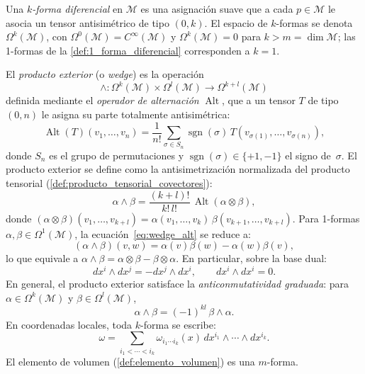\begin{definition}\label{def:producto_exterior_k_formas}
Una \textit{$k$-forma diferencial} en $\mathcal{M}$ es una asignación suave que a cada $p \in \mathcal{M}$ le asocia un tensor antisimétrico de tipo $(0, k)$. El espacio de $k$-formas se denota $\Omega^k(\mathcal{M})$, con $\Omega^0(\mathcal{M}) = C^\infty(\mathcal{M})$ y $\Omega^k(\mathcal{M}) = 0$ para $k > m = \dim \mathcal{M}$; las 1-formas de la \autoref{def:1_forma_diferencial} corresponden a $k = 1$.

El \textit{producto exterior} (o \textit{wedge}) es la operación
\[
\wedge: \Omega^k(\mathcal{M}) \times \Omega^l(\mathcal{M}) \longrightarrow \Omega^{k+l}(\mathcal{M})
\]
definida mediante el \textit{operador de alternación} $\operatorname{Alt}$, que a un tensor $T$ de tipo $(0,n)$ le asigna su parte totalmente antisimétrica:
\[
\operatorname{Alt}(T)(v_1, \ldots, v_n) = \frac{1}{n!} \sum_{\sigma \in S_n} \operatorname{sgn}(\sigma)\, T(v_{\sigma(1)}, \ldots, v_{\sigma(n)}),
\]
donde $S_n$ es el grupo de permutaciones y $\operatorname{sgn}(\sigma) \in \{+1, -1\}$ el signo de~$\sigma$. El producto exterior se define como la antisimetrización normalizada del producto tensorial (\autoref{def:producto_tensorial_covectores}):
\begin{equation}\label{eq:wedge_alt}
\alpha \wedge \beta = \frac{(k+l)!}{k!\,l!}\, \operatorname{Alt}(\alpha \otimes \beta),
\end{equation}
donde $(\alpha \otimes \beta)(v_1, \ldots, v_{k+l}) = \alpha(v_1, \ldots, v_k)\,\beta(v_{k+1}, \ldots, v_{k+l})$. Para 1-formas $\alpha, \beta \in \Omega^1(\mathcal{M})$, la ecuación~\eqref{eq:wedge_alt} se reduce a:
\[
(\alpha \wedge \beta)(v, w) = \alpha(v)\beta(w) - \alpha(w)\beta(v),
\]
lo que equivale a $\alpha \wedge \beta = \alpha \otimes \beta - \beta \otimes \alpha$. En particular, sobre la base dual:
\[
dx^i \wedge dx^j = -dx^j \wedge dx^i, \qquad dx^i \wedge dx^i = 0.
\]
En general, el producto exterior satisface la \textit{anticonmutatividad graduada}: para $\alpha \in \Omega^k(\mathcal{M})$ y $\beta \in \Omega^l(\mathcal{M})$,
\[
\alpha \wedge \beta = (-1)^{kl}\, \beta \wedge \alpha.
\]
En coordenadas locales, toda $k$-forma se escribe:
\[
\omega = \sum_{i_1 < \cdots < i_k} \omega_{i_1 \cdots i_k}(x) \, dx^{i_1} \wedge \cdots \wedge dx^{i_k}.
\]
El elemento de volumen (\autoref{def:elemento_volumen}) es una $m$-forma.
\end{definition}

